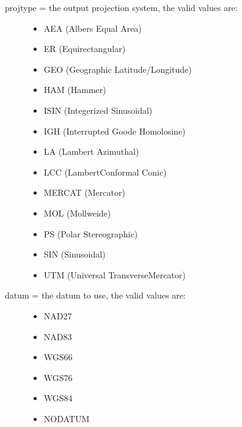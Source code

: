 \documentclass[a4paper,11pt,oneside]{sphinxmanual}
\begin{document}
\begin{fulllineitems}
\begin{fulllineitems}
\begin{description}
\begin{itemize}
\end{itemize}

\item[{projtype = the output projection system, the valid values are:}] \leavevmode\begin{itemize}
\item {} 
AEA (Albers Equal Area)

\item {} 
ER (Equirectangular)

\item {} 
GEO (Geographic Latitude/Longitude)

\item {} 
HAM (Hammer)

\item {} 
ISIN (Integerized Sinusoidal)

\item {} 
IGH (Interrupted Goode Homolosine)

\item {} 
LA (Lambert Azimuthal)

\item {} 
LCC (LambertConformal Conic)

\item {} 
MERCAT (Mercator)

\item {} 
MOL (Mollweide)

\item {} 
PS (Polar Stereographic)

\item {} 
SIN (Sinusoidal)

\item {} 
UTM (Universal TransverseMercator)

\end{itemize}

\item[{datum = the datum to use, the valid values are:}] \leavevmode\begin{itemize}
\item {} 
NAD27

\item {} 
NAD83

\item {} 
WGS66

\item {} 
WGS76

\item {} 
WGS84

\item {} 
NODATUM


\end{itemize}
\end{description}
\end{fulllineitems}
\end{fulllineitems}
\end{document}
